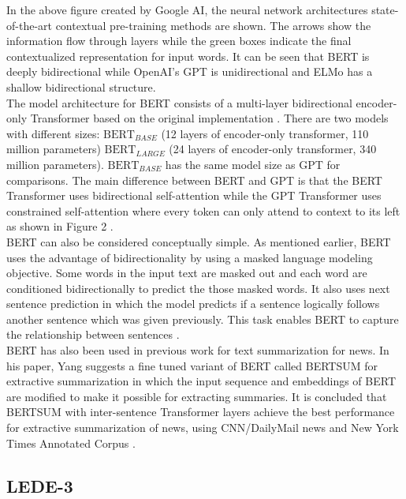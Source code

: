 \documentclass{article}
\newcommand{\bertlarge}{$\text{BERT}_{LARGE}$ }
\newcommand{\bertbase}{$\text{BERT}_{BASE}$ }
\begin{document}
In the above figure created by Google AI, the neural network architectures state-of-the-art contextual pre-training methods are shown. The arrows show the information flow through layers while the green boxes indicate the final contextualized representation for input words. It can be seen that BERT is deeply bidirectional while OpenAI's GPT is unidirectional and ELMo has a shallow bidirectional structure.\\

The model architecture for BERT consists of a multi-layer bidirectional encoder-only Transformer based on the original implementation \cite{attention}. There are two models with different sizes: \bertbase (12 layers of encoder-only transformer, 110 million parameters) \bertlarge(24 layers of encoder-only transformer, 340 million parameters). \bertbase has the same model size as GPT for comparisons. The main difference between BERT and GPT is that the BERT Transformer uses bidirectional self-attention while the GPT Transformer uses constrained self-attention where every token can only attend to context to its left as shown in Figure 2 \cite{devlin2019bert}.\\

BERT can also be considered conceptually simple. As mentioned earlier, BERT uses the advantage of bidirectionality by using a masked language modeling objective. Some words in the input text are masked out and each word are conditioned bidirectionally to predict the those masked words. It also uses next sentence prediction in which the model predicts if a sentence logically follows another sentence which was given previously. This task enables BERT to capture the relationship between sentences \cite{devlin2019bert}.\\

BERT has also been used in previous work for text summarization for news. In his paper, Yang suggests a fine tuned variant of BERT called BERTSUM for extractive summarization in which the input sequence and embeddings of BERT are modified to make it possible for extracting summaries. It is concluded that BERTSUM with inter-sentence Transformer layers achieve the best performance for extractive summarization of news, using CNN/DailyMail news and New York Times Annotated Corpus \cite{liu2019finetune}.


\subsection*{LEDE-3 }
\end{document}
